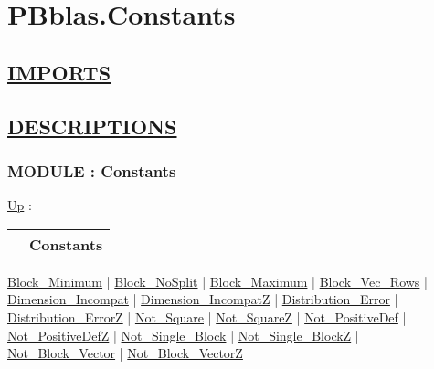 \chapter*{PBblas.Constants}
\hypertarget{ecldoc:toc:PBblas.Constants}{}

\section*{\underline{IMPORTS}}

\section*{\underline{DESCRIPTIONS}}
\subsection*{MODULE : Constants}
\hypertarget{ecldoc:PBblas.Constants}{}
\hyperlink{ecldoc:toc:PBblas}{Up} :

{\renewcommand{\arraystretch}{1.5}
\begin{tabularx}{\textwidth}{|>{\raggedright\arraybackslash}l|X|}
\hline
\hspace{0pt} & Constants \\
\hline
\end{tabularx}
}

\par


\hyperlink{ecldoc:pbblas.constants.block_minimum}{Block\_Minimum}  |
\hyperlink{ecldoc:pbblas.constants.block_nosplit}{Block\_NoSplit}  |
\hyperlink{ecldoc:pbblas.constants.block_maximum}{Block\_Maximum}  |
\hyperlink{ecldoc:pbblas.constants.block_vec_rows}{Block\_Vec\_Rows}  |
\hyperlink{ecldoc:pbblas.constants.dimension_incompat}{Dimension\_Incompat}  |
\hyperlink{ecldoc:pbblas.constants.dimension_incompatz}{Dimension\_IncompatZ}  |
\hyperlink{ecldoc:pbblas.constants.distribution_error}{Distribution\_Error}  |
\hyperlink{ecldoc:pbblas.constants.distribution_errorz}{Distribution\_ErrorZ}  |
\hyperlink{ecldoc:pbblas.constants.not_square}{Not\_Square}  |
\hyperlink{ecldoc:pbblas.constants.not_squarez}{Not\_SquareZ}  |
\hyperlink{ecldoc:pbblas.constants.not_positivedef}{Not\_PositiveDef}  |
\hyperlink{ecldoc:pbblas.constants.not_positivedefz}{Not\_PositiveDefZ}  |
\hyperlink{ecldoc:pbblas.constants.not_single_block}{Not\_Single\_Block}  |
\hyperlink{ecldoc:pbblas.constants.not_single_blockz}{Not\_Single\_BlockZ}  |
\hyperlink{ecldoc:pbblas.constants.not_block_vector}{Not\_Block\_Vector}  |
\hyperlink{ecldoc:pbblas.constants.not_block_vectorz}{Not\_Block\_VectorZ}  |


